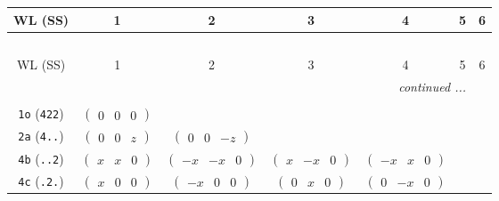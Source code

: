 \documentclass[fleqn,9pt,landscape]{jsarticle}
\begin{document}
\begin{center}
\renewcommand{\arraystretch}{1.2}
\begin{longtable}{ccccccc}
 \hline \hline
WL (SS) & 1 & 2 & 3 & 4 & 5 & 6 \\ \hline \endfirsthead

\multicolumn{6}{l}{\tablename\ \thetable{}} \\
 \hline \hline
WL (SS) & 1 & 2 & 3 & 4 & 5 & 6 \\ \hline \endhead

 \hline \hline
\multicolumn{6}{r}{\footnotesize\it continued ...} \\ \endfoot

 \hline \hline
\multicolumn{6}{r}{} \\ \endlastfoot

{\tt 1o} ({\tt 422}) & $ \begin{pmatrix} 0 & 0 & 0 \end{pmatrix} $ & $  $ & $  $ & $  $ & $  $ & $  $ \\ \hline
{\tt 2a} ({\tt 4..}) & $ \begin{pmatrix} 0 & 0 & z \end{pmatrix} $ & $ \begin{pmatrix} 0 & 0 & - z \end{pmatrix} $ & $  $ & $  $ & $  $ & $  $ \\ \hline
{\tt 4b} ({\tt ..2}) & $ \begin{pmatrix} x & x & 0 \end{pmatrix} $ & $ \begin{pmatrix} - x & - x & 0 \end{pmatrix} $ & $ \begin{pmatrix} x & - x & 0 \end{pmatrix} $ & $ \begin{pmatrix} - x & x & 0 \end{pmatrix} $ & $  $ & $  $ \\ \hline
{\tt 4c} ({\tt .2.}) & $ \begin{pmatrix} x & 0 & 0 \end{pmatrix} $ & $ \begin{pmatrix} - x & 0 & 0 \end{pmatrix} $ & $ \begin{pmatrix} 0 & x & 0 \end{pmatrix} $ & $ \begin{pmatrix} 0 & - x & 0 \end{pmatrix} $ & $  $ & $  $ \\ \hline

\end{longtable}
\end{center}
\end{document}
